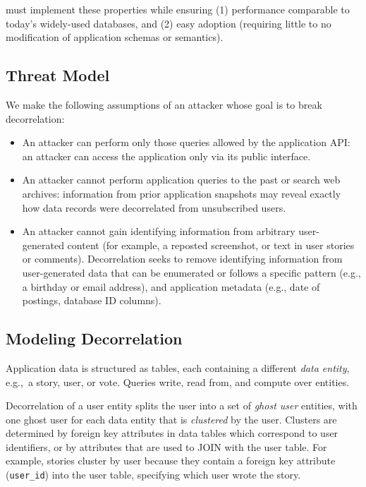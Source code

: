 \sys{} must implement these properties while ensuring (1) performance comparable to today’s
widely-used databases, and (2) easy adoption (requiring little to no modification of application
schemas or semantics).

\subsection{Threat Model} 
We make the following assumptions of an attacker whose goal is to break decorrelation:
\begin{itemize}
    \item An attacker can perform only those queries allowed by the application API: an
attacker can access the application only via its public interface. 

    \item An attacker cannot perform application queries to the past or search web archives:
    information from prior application snapshots may reveal 
    exactly how data records were decorrelated from unsubscribed users. 

    \item An attacker cannot gain identifying information from arbitrary user-generated content (for
        example, a reposted screenshot, or text in user stories or comments). Decorrelation seeks to
        remove identifying information from user-generated data that can be enumerated or follows a
        specific pattern (e.g., a birthday or email address), and application metadata (e.g., date
        of postings, database ID columns).
\end{itemize}

\subsection{Modeling Decorrelation}
Application data is structured as tables, each containing a different \emph{data entity}, e.g.,\ a
story, user, or vote.  
Queries write, read
from, and compute over entities. 

Decorrelation of a user entity splits the user into a set of \emph{ghost user} entities, with one
ghost user for each data entity that is \emph{clustered} by the user.  Clusters are determined by
foreign key attributes in data tables which correspond to user identifiers, or by attributes that
are used to JOIN with the user table.  For example, stories cluster by user because they contain a
foreign key attribute (\texttt{user\_id}) into the user table, specifying which user wrote the
story.

